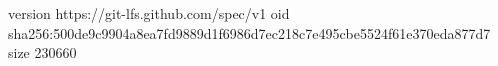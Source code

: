 version https://git-lfs.github.com/spec/v1
oid sha256:500de9c9904a8ea7fd9889d1f6986d7ec218c7e495cbe5524f61e370eda877d7
size 230660
